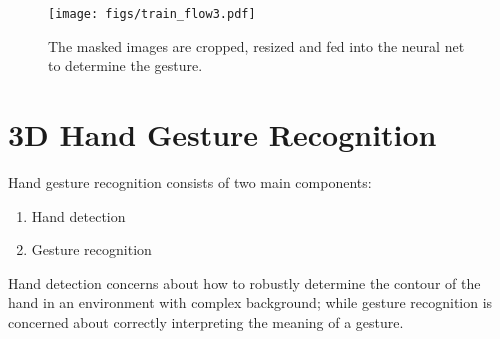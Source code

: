 \documentclass[conference]{IEEEtran}
\begin{document}
\begin{figure*}
\centering
\texttt{[image: figs/train\_flow3.pdf]}
\caption{The masked images are cropped, resized and fed into the neural net to determine the gesture.}
\label{flow_diagram}
\end{figure*}
%

\section{3D Hand Gesture Recognition}
Hand gesture recognition consists of two main components:
\begin{enumerate}
    \item Hand detection
    \item Gesture recognition
\end{enumerate}
Hand detection concerns about how to robustly determine the contour of the hand in an environment with complex background; while gesture recognition is concerned about correctly interpreting the meaning of a gesture.
\end{document}

